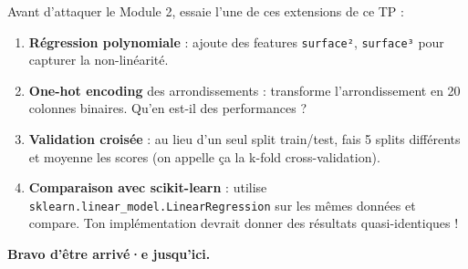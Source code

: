\documentclass[
  french,
  11pt,
  a4paper,
]{scrbook}
\providecommand{\tightlist}{%
  \setlength{\itemsep}{0pt}\setlength{\parskip}{0pt}}
\begin{document}
\begin{tcolorbox}[enhanced jigsaw, arc=.35mm, bottomrule=.15mm, bottomtitle=1mm, breakable, colback=white, colbacktitle=quarto-callout-tip-color!10!white, colframe=quarto-callout-tip-color-frame, coltitle=black, left=2mm, leftrule=.75mm, opacityback=0, opacitybacktitle=0.6, rightrule=.15mm, title=\textcolor{quarto-callout-tip-color}{\faLightbulb}\hspace{0.5em}{💡 Défi optionnel pour consolider}, titlerule=0mm, toprule=.15mm, toptitle=1mm]

Avant d'attaquer le Module 2, essaie l'une de ces extensions de ce TP :

\begin{enumerate}
\def\labelenumi{\arabic{enumi}.}
\tightlist
\item
  \textbf{Régression polynomiale} : ajoute des features
  \texttt{surface²}, \texttt{surface³} pour capturer la non-linéarité.
\item
  \textbf{One-hot encoding} des arrondissements : transforme
  l'arrondissement en 20 colonnes binaires. Qu'en est-il des
  performances ?
\item
  \textbf{Validation croisée} : au lieu d'un seul split train/test, fais
  5 splits différents et moyenne les scores (on appelle ça la k-fold
  cross-validation).
\item
  \textbf{Comparaison avec scikit-learn} : utilise
  \texttt{sklearn.linear\_model.LinearRegression} sur les mêmes données
  et compare. Ton implémentation devrait donner des résultats
  quasi-identiques !
\end{enumerate}

\end{tcolorbox}

\textbf{Bravo d'être arrivé·e jusqu'ici. 🎉}


\backmatter
\end{document}
